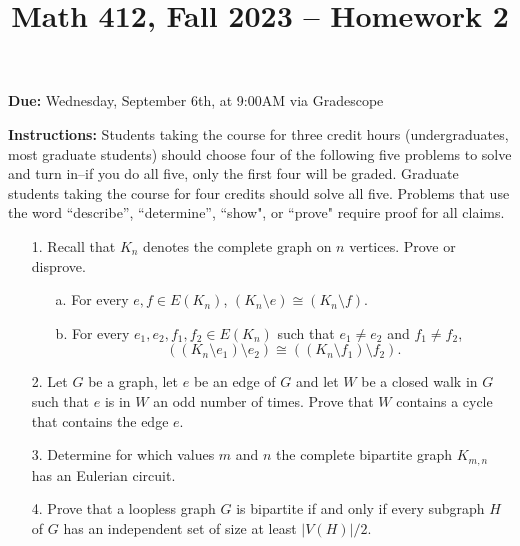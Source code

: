 \documentclass[12pt]{article}
\title{Math 412, Fall 2023 -- Homework 2}
\date{}
\begin{document}
 \maketitle
\vspace{-80pt}

\textbf{Due:} Wednesday, September 6th, at 9:00AM via Gradescope

\textbf{Instructions:} Students taking the course for three credit hours (undergraduates, most graduate
students) should choose four of the following five problems to solve and turn in--if you do all five, only the first four will be graded. Graduate students
taking the course for four credits should solve all five. Problems that use the word ``describe”,
``determine”, ``show", or ``prove" require proof for all claims.

\begin{enumerate}

\item[1.] Recall that $K_n$ denotes the complete graph on $n$ vertices. Prove or disprove.

\begin{enumerate}
    \item[a.] For every $e,f\in E(K_n)$, $(K_n\setminus e) \cong (K_n\setminus f)$.
    \item[b.] For every $e_1,e_2,f_1,f_2\in E(K_n)$ such that $e_1\ne e_2$ and $f_1\ne f_2$, \[((K_n\setminus e_1)\setminus e_2) \cong ((K_n\setminus f_1)\setminus f_2).\]
\end{enumerate}

\item[2.] Let $G$ be a graph, let $e$ be an edge of $G$ and let $W$ be a closed walk in $G$ such that $e$ is in $W$ an odd number of times. Prove that $W$ contains a cycle that contains the edge $e$. 

\item[3.] Determine for which values $m$ and $n$ the complete bipartite graph $K_{m,n}$ has an Eulerian circuit.

\item[4.] Prove that a loopless graph $G$ is bipartite if and only if every subgraph $H$ of $G$ has an independent set of size at least $|V(H)|/2$.


\end{enumerate}
\end{document}

